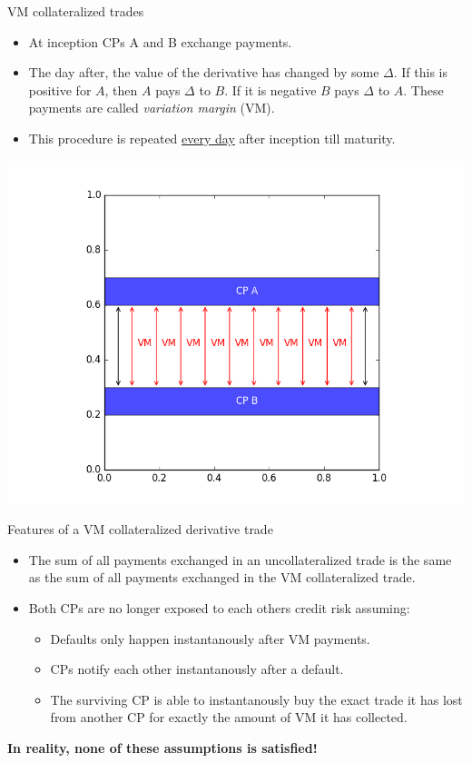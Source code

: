 \documentclass[t]{beamer}
\begin{document}
\begin{frame}{VM collateralized trades}
	\begin{itemize}
		\item
			At inception CPs A and B exchange payments.
		\item
			The day after, the value of the derivative has changed by some $\Delta$. If this is positive for $A$, then $A$ pays $\Delta$ to $B$. If it is negative $B$ pays $\Delta$ to $A$. These payments are called \emph{variation margin} (VM).
		\item
			This procedure is repeated \underline{every day} after inception till maturity.
	\end{itemize}
	\vspace{-2em}
	\begin{center}
		\includegraphics[scale=0.35]{pics/cashflows_vm_coll.png}
	\end{center}	
\end{frame}

\begin{frame}{Features of a VM collateralized derivative trade}
	\begin{itemize}
		\item
			The sum of all payments exchanged in an uncollateralized trade is the same as the sum of all payments exchanged in the VM collateralized trade.
		\item
			Both CPs are no longer exposed to each others credit risk assuming:
		\begin{itemize}
			\item
				Defaults only happen instantanously after VM payments.
			\item
				CPs notify each other instantanously after a default.
			\item
				The surviving CP is able to instantanously buy the exact trade it has lost from another CP for exactly the amount of VM it has collected.
		\end{itemize}
	\end{itemize}
	\begin{center}
		\textbf{In reality, none of these assumptions is satisfied!}
	\end{center}
\end{frame}
\end{document}
